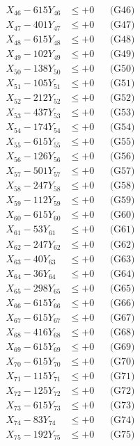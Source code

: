 \documentclass[a4paper,10pt]{article}
\begin{document}
{\begin{align}
X_{46} - 615Y_{46} &\leq +0 && \text{(G46)} \\
X_{47} - 401Y_{47} &\leq +0 && \text{(G47)} \\
X_{48} - 615Y_{48} &\leq +0 && \text{(G48)} \\
X_{49} - 102Y_{49} &\leq +0 && \text{(G49)} \\
X_{50} - 138Y_{50} &\leq +0 && \text{(G50)} \\
\allowbreak
X_{51} - 105Y_{51} &\leq +0 && \text{(G51)} \\
X_{52} - 212Y_{52} &\leq +0 && \text{(G52)} \\
X_{53} - 437Y_{53} &\leq +0 && \text{(G53)} \\
X_{54} - 174Y_{54} &\leq +0 && \text{(G54)} \\
X_{55} - 615Y_{55} &\leq +0 && \text{(G55)} \\
X_{56} - 126Y_{56} &\leq +0 && \text{(G56)} \\
X_{57} - 501Y_{57} &\leq +0 && \text{(G57)} \\
X_{58} - 247Y_{58} &\leq +0 && \text{(G58)} \\
X_{59} - 112Y_{59} &\leq +0 && \text{(G59)} \\
X_{60} - 615Y_{60} &\leq +0 && \text{(G60)} \\
\allowbreak
X_{61} - 53Y_{61} &\leq +0 && \text{(G61)} \\
X_{62} - 247Y_{62} &\leq +0 && \text{(G62)} \\
X_{63} - 40Y_{63} &\leq +0 && \text{(G63)} \\
X_{64} - 36Y_{64} &\leq +0 && \text{(G64)} \\
X_{65} - 298Y_{65} &\leq +0 && \text{(G65)} \\
X_{66} - 615Y_{66} &\leq +0 && \text{(G66)} \\
X_{67} - 615Y_{67} &\leq +0 && \text{(G67)} \\
X_{68} - 416Y_{68} &\leq +0 && \text{(G68)} \\
X_{69} - 615Y_{69} &\leq +0 && \text{(G69)} \\
X_{70} - 615Y_{70} &\leq +0 && \text{(G70)} \\
\allowbreak
X_{71} - 115Y_{71} &\leq +0 && \text{(G71)} \\
X_{72} - 125Y_{72} &\leq +0 && \text{(G72)} \\
X_{73} - 615Y_{73} &\leq +0 && \text{(G73)} \\
X_{74} - 83Y_{74} &\leq +0 && \text{(G74)} \\
X_{75} - 192Y_{75} &\leq +0 && \text{(G75)} \\

\end{align}}
\end{document}
